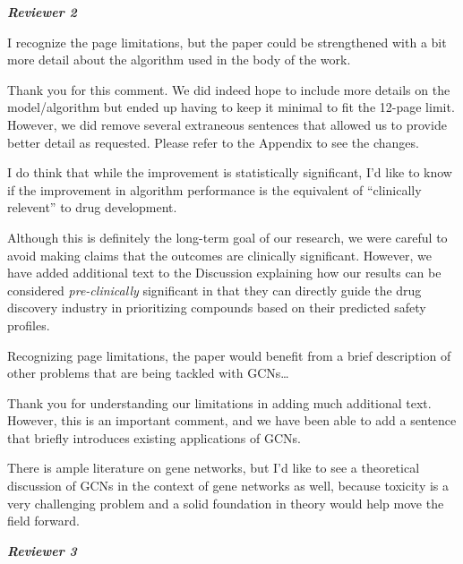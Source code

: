 \documentclass{ibilttr}
\begin{document}
\textit{\textbf{Reviewer 2}}

\vspace{-1em}
\begin{displayquote}
I recognize the page limitations, but the paper could be strengthened
with a bit more detail about the algorithm used in the body of the
work.
\end{displayquote}

Thank you for this comment. We did indeed hope to include more details
on the model/algorithm but ended up having to keep it minimal to fit
the 12-page limit. However, we did remove several extraneous sentences
that allowed us to provide better detail as requested. Please refer to
the Appendix to see the changes.

\begin{displayquote}
I do think that while the improvement is statistically significant,
I'd like to know if the improvement in algorithm performance is the
equivalent of ``clinically relevent'' to drug development.
\end{displayquote}

Although this is definitely the long-term goal of our research, we
were careful to avoid making claims that the outcomes are clinically
significant. However, we have added additional text to the Discussion
explaining how our results can be considered \textit{pre-clinically}
significant in that they can directly guide the drug discovery
industry in prioritizing compounds based on their predicted safety
profiles.

\begin{displayquote}
Recognizing page limitations, the paper would benefit from a brief
description of other problems that are being tackled with GCNs\ldots
\end{displayquote}

Thank you for understanding our limitations in adding much additional
text. However, this is an important comment, and we have been able to
add a sentence that briefly introduces existing applications of GCNs.

\begin{displayquote}
There is ample literature on gene networks, but I'd like to see a
theoretical discussion of GCNs in the context of gene networks as
well, because toxicity is a very challenging problem and a solid
foundation in theory would help move the field forward.
\end{displayquote}

\textit{\textbf{Reviewer 3}}
\end{document}
